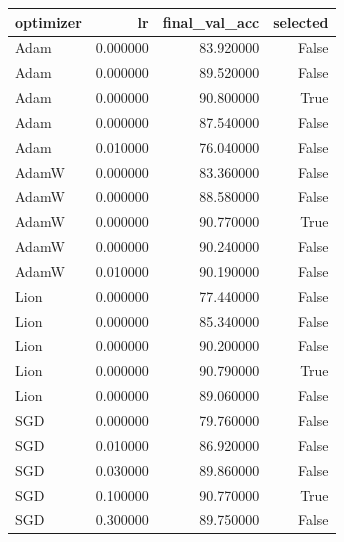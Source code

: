 \begin{tabular}{lrrr}
\toprule
optimizer & lr & final\_val\_acc & selected \\
\midrule
Adam & 0.000000 & 83.920000 & False \\
Adam & 0.000000 & 89.520000 & False \\
Adam & 0.000000 & 90.800000 & True \\
Adam & 0.000000 & 87.540000 & False \\
Adam & 0.010000 & 76.040000 & False \\
AdamW & 0.000000 & 83.360000 & False \\
AdamW & 0.000000 & 88.580000 & False \\
AdamW & 0.000000 & 90.770000 & True \\
AdamW & 0.000000 & 90.240000 & False \\
AdamW & 0.010000 & 90.190000 & False \\
Lion & 0.000000 & 77.440000 & False \\
Lion & 0.000000 & 85.340000 & False \\
Lion & 0.000000 & 90.200000 & False \\
Lion & 0.000000 & 90.790000 & True \\
Lion & 0.000000 & 89.060000 & False \\
SGD & 0.000000 & 79.760000 & False \\
SGD & 0.010000 & 86.920000 & False \\
SGD & 0.030000 & 89.860000 & False \\
SGD & 0.100000 & 90.770000 & True \\
SGD & 0.300000 & 89.750000 & False \\
\bottomrule
\end{tabular}
